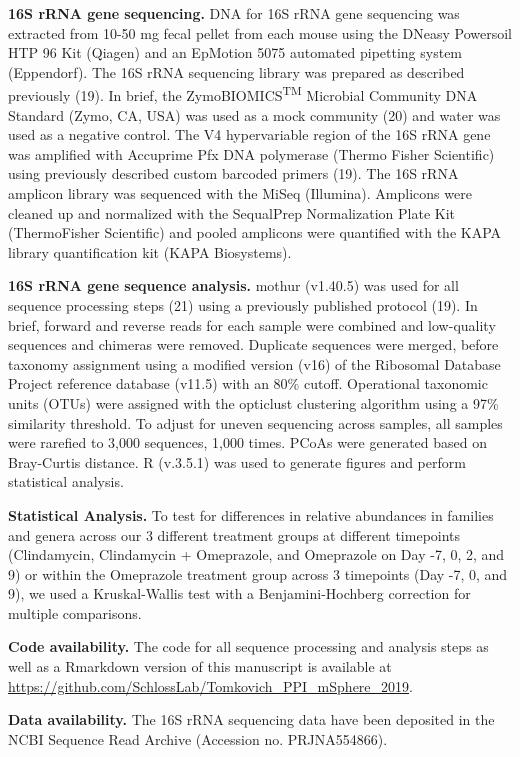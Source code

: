 \documentclass[11pt,]{article}
\begin{document}
\textbf{16S rRNA gene sequencing.} DNA for 16S rRNA gene sequencing was
extracted from 10-50 mg fecal pellet from each mouse using the DNeasy
Powersoil HTP 96 Kit (Qiagen) and an EpMotion 5075 automated pipetting
system (Eppendorf). The 16S rRNA sequencing library was prepared as
described previously (19). In brief, the ZymoBIOMICS\textsuperscript{TM}
Microbial Community DNA Standard (Zymo, CA, USA) was used as a mock
community (20) and water was used as a negative control. The V4
hypervariable region of the 16S rRNA gene was amplified with Accuprime
Pfx DNA polymerase (Thermo Fisher Scientific) using previously described
custom barcoded primers (19). The 16S rRNA amplicon library was
sequenced with the MiSeq (Illumina). Amplicons were cleaned up and
normalized with the SequalPrep Normalization Plate Kit (ThermoFisher
Scientific) and pooled amplicons were quantified with the KAPA library
quantification kit (KAPA Biosystems).

\textbf{16S rRNA gene sequence analysis.} mothur (v1.40.5) was used for
all sequence processing steps (21) using a previously published protocol
(19). In brief, forward and reverse reads for each sample were combined
and low-quality sequences and chimeras were removed. Duplicate sequences
were merged, before taxonomy assignment using a modified version (v16)
of the Ribosomal Database Project reference database (v11.5) with an
80\% cutoff. Operational taxonomic units (OTUs) were assigned with the
opticlust clustering algorithm using a 97\% similarity threshold. To
adjust for uneven sequencing across samples, all samples were rarefied
to 3,000 sequences, 1,000 times. PCoAs were generated based on
Bray-Curtis distance. R (v.3.5.1) was used to generate figures and
perform statistical analysis.

\textbf{Statistical Analysis.} To test for differences in relative
abundances in families and genera across our 3 different treatment
groups at different timepoints (Clindamycin, Clindamycin + Omeprazole,
and Omeprazole on Day -7, 0, 2, and 9) or within the Omeprazole
treatment group across 3 timepoints (Day -7, 0, and 9), we used a
Kruskal-Wallis test with a Benjamini-Hochberg correction for multiple
comparisons.

\textbf{Code availability.} The code for all sequence processing and
analysis steps as well as a Rmarkdown version of this manuscript is
available at
\url{https://github.com/SchlossLab/Tomkovich_PPI_mSphere_2019}.

\textbf{Data availability.} The 16S rRNA sequencing data have been
deposited in the NCBI Sequence Read Archive (Accession no. PRJNA554866).
\end{document}
